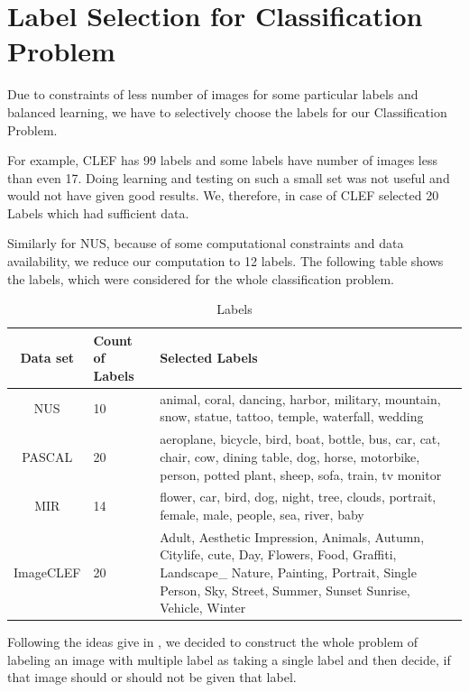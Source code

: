 \vspace*{1cm}
\section{Label Selection for Classification Problem}
Due to constraints of less number of images for some particular labels and balanced learning, we have to selectively
choose the labels for our Classification Problem.

For example, CLEF has 99 labels and some labels have number of images less than even 17. Doing learning and testing on such a small set was not useful and would not have given good results. We, therefore, in case of CLEF selected 20 Labels which had sufficient data.

Similarly for NUS, because of some computational constraints and data availability, we reduce our computation to 12 labels. The following table shows the labels, which were considered for the whole classification problem.

\begin{table}[ht]
\caption{Labels} %
\centering %
\begin{tabular}{|c|p{2cm}|p{7cm}| } %
\hline\hline %
Data set & Count of Labels & Selected Labels \\ [0.5ex] \hline%
\hline %
NUS & 10 & animal, coral, dancing, harbor, military, mountain, snow, statue, tattoo, temple, waterfall, wedding \\  [1ex] \hline
PASCAL & 20 & aeroplane, bicycle, bird, boat, bottle, bus, car, cat, chair, cow, dining table, dog, horse, motorbike, person, potted plant, sheep, sofa, train, tv monitor \\  [1ex] \hline
MIR & 14 & flower, car, bird, dog, night, tree, clouds, portrait, female, male, people, sea, river, baby \\  [1ex] \hline
ImageCLEF & 20 & Adult, Aesthetic Impression, Animals, Autumn, Citylife, cute, Day, Flowers, Food, Graffiti, Landscape\_ Nature, Painting, Portrait, Single Person, Sky, Street, Summer, Sunset Sunrise, Vehicle, Winter \\  [1ex] \hline
\hline %
\end{tabular}
\label{table:nonlin} %
\end{table}
Following the ideas give in \citet*{Jure}, we decided to construct the whole problem of labeling an image with multiple label as taking a single label and then decide, if that image should or should not be given that label.

